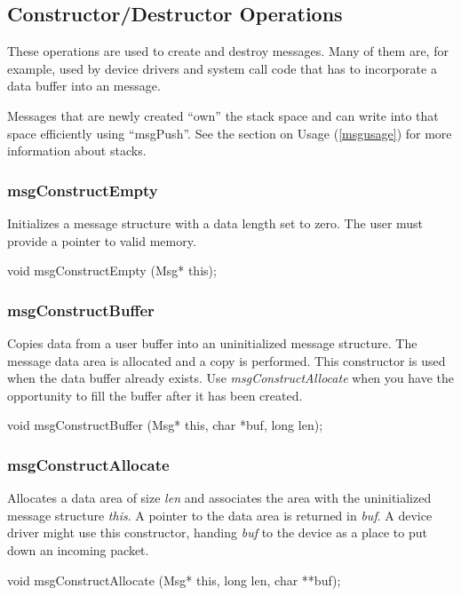 \subsection{Constructor/Destructor Operations}

These operations are used to create and destroy messages. Many of
them are, for example, used by device drivers and system call code
that has to incorporate a data buffer into an \xk{} message.

Messages that are newly created ``own'' the stack space and can
write into that space efficiently using ``msgPush''.  See the section
on Usage (\ref{msgusage}) for more information about stacks.

\subsubsection{msgConstructEmpty}

Initializes a message structure with a data length set to zero.
The user must provide a pointer to valid memory.
\medskip

{\sem void} {\bold msgConstructEmpty} ({\sem Msg*} {\caps this});

\subsubsection{msgConstructBuffer}

Copies data from a user buffer into an uninitialized message
structure.  The message data area is allocated and a copy is
performed.  This constructor is used when the data buffer already
exists. Use {\em msgConstructAllocate} when you have the opportunity
to fill the buffer after it has been created.
\medskip

{\sem void} {\bold msgConstructBuffer} ({\sem Msg*} {\caps this},
{\sem char} *{\caps buf}, {\sem long} {\caps len});

\subsubsection{msgConstructAllocate}

Allocates 
a data area of size {\em len} and associates the area with the
uninitialized message structure {\em this}.  A pointer to the data
area is returned in {\em buf}.  A device driver might use this
constructor, handing {\em buf} to the device as a place to put down an
incoming packet.
\medskip

{\sem void} {\bold msgConstructAllocate} ({\sem Msg*} {\caps this}, {\sem long} {\caps len}, {\sem char} **{\caps buf});
\medskip

